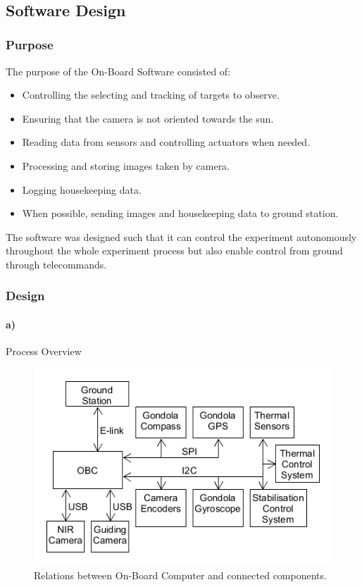 $  $\pagebreak
\subsection{Software Design}

\subsubsection{Purpose}

The purpose of the On-Board Software consisted of:
\begin{itemize}
    \item Controlling the selecting and tracking of targets to observe.
    \item Ensuring that the camera is not oriented towards the sun.
    \item Reading data from sensors and controlling actuators when needed.
    \item Processing and storing images taken by camera.
    \item Logging housekeeping data.
    \item When possible, sending images and housekeeping data to ground station.
\end{itemize}

The software was designed such that it can control the experiment autonomously throughout the whole experiment process but also enable control from ground through telecommands.

\subsubsection{Design}
\label{sec:4.8.2}

\paragraph{a)} Process Overview

\begin{figure}[H]
    \centering
    \includegraphics[width=.9\textwidth]{4-experiment-design/img/software/process-overview.png}
    \caption{Relations between On-Board Computer and connected components.}
    \label{fig:software-process-overview}
\end{figure}

